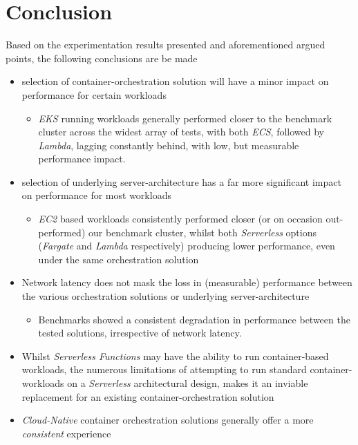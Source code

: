 \chapter{Conclusion}
Based on the experimentation results presented and aforementioned argued points, the following conclusions are be made
\begin{itemize}
  \item selection of container-orchestration solution will have a minor impact on performance for certain workloads
        \begin{itemize}
          \item \textit{EKS} running workloads generally performed closer to the benchmark cluster across the widest array of tests,
                with both \textit{ECS}, followed by \textit{Lambda}, lagging constantly behind, with low, but measurable performance impact.
        \end{itemize}
  \item selection of underlying server-architecture has a far more significant impact on performance for most workloads
        \begin{itemize}
          \item \textit{EC2} based workloads consistently performed closer (or on occasion out-performed) our benchmark cluster,
                whilst both \textit{Serverless} options (\textit{Fargate} and \textit{Lambda} respectively) producing lower performance,
                even under the same orchestration solution
        \end{itemize}
  \item Network latency does not mask the loss in (measurable) performance between the various orchestration solutions or underlying server-architecture
        \begin{itemize}
          \item Benchmarks showed a consistent degradation in performance between the tested solutions, irrespective of network latency.
        \end{itemize}
  \item Whilst \textit{Serverless Functions} may have the ability to run container-based workloads,
        the numerous limitations of attempting to run standard container-workloads on a
        \textit{Serverless} architectural design, makes it an inviable replacement for an existing container-orchestration solution
  \item \textit{Cloud-Native} container orchestration solutions generally offer a more \emph{consistent} experience

\end{itemize}

